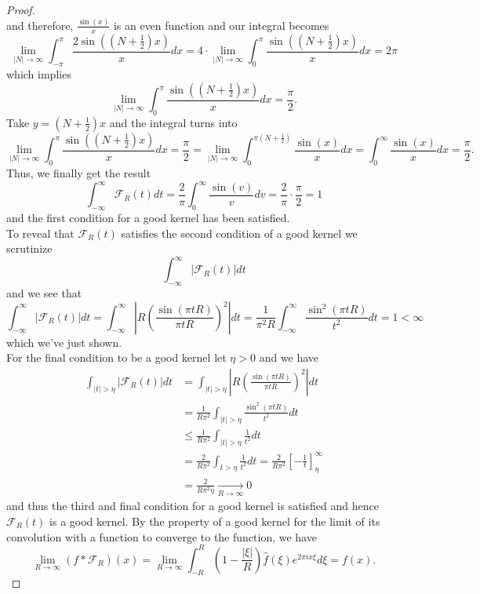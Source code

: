 \documentclass{article}
\begin{document}
\begin{proof}
\[  \]
  and therefore, $\frac{\sin(x)}{x}$ is an even function and our integral becomes
  \[
    \lim\limits_{|N| \to \infty} \int_{-\pi}^{\pi} \frac{2 \sin\left(\left(N + \frac{1}{2}\right)x\right)}{x}dx = 4 \cdot \lim\limits_{|N| \to \infty} \int_{0}^{\pi} \frac{ \sin\left(\left(N + \frac{1}{2}\right)x\right)}{x}dx = 2 \pi 
  \]
  which implies 
  \[
    \lim\limits_{|N| \to \infty}\int_{0}^{\pi} \frac{ \sin\left(\left(N + \frac{1}{2}\right)x\right)}{x}dx = \frac{\pi}{2}.
  \]
  Take $y = \left(N + \frac{1}{2}\right)x$ and the integral turns into 
  \[
    \lim\limits_{|N| \to \infty}\int_{0}^{\pi} \frac{ \sin\left(\left(N + \frac{1}{2}\right)x\right)}{x}dx = \frac{\pi}{2} = \lim\limits_{|N| \to \infty}\int_{0}^{\pi\left(N + \frac{1}{2}\right)} \frac{ \sin\left(x\right)}{x}dx = \int_{0}^{\infty} \frac{\sin(x)}{x}dx =  \frac{\pi}{2}.
  \]
  Thus, we finally get the result
  \[
  \int_{-\infty}^{\infty}  \mathcal{F}_R(t) dt = \frac{2}{\pi}\int_0^{\infty}\frac{\sin(v)}{v}dv = \frac{2}{\pi}\cdot \frac{\pi}{2} = 1
  \]
  and the first condition for a good kernel has been satisfied. \\ 

   To reveal that $\mathcal{F}_R(t)$ satisfies the second condition of a good kernel we scrutinize
   \[
   \int_{-\infty}^{\infty}|\mathcal{F}_R(t)|dt 
   \]
   and we see that 
   \[
    \int_{-\infty}^{\infty}|\mathcal{F}_R(t)|dt = \int_{-\infty}^{\infty} \left|R \left(\frac{\sin(\pi t R)}{\pi t R} \right)^2 \right| dt = \frac{1}{\pi^2 R} \int_{-\infty}^{\infty} \frac{\sin^2(\pi t R)}{t^2}dt = 1 < \infty
   \]
   which we've just shown.\\
   
   For the final condition to be a good kernel let $\eta > 0$ and we have 
   \begin{align*}
    \int_{|t| > \eta}|\mathcal{F}_R(t)|dt &= \int_{|t| > \eta} \left|R \left(\frac{\sin(\pi t R)}{\pi t R}\right)^2 \right| dt \\
    &= \frac{1}{R\pi^2} \int_{|t| > \eta} \frac{\sin^2(\pi t R)}{t^2}dt \\
    &\leq \frac{1}{R\pi^2} \int_{|t| > \eta} \frac{1}{t^2} dt \\
    &= \frac{2}{R \pi^2} \int_{t > \eta} \frac{1}{t^2} dt = \frac{2}{R\pi^2} \left[-\frac{1}{t}\right]_{\eta}^{\infty} \\
    &= \frac{2}{R \pi^2 \eta} \xrightarrow[R \to \infty]{} 0
   \end{align*}
   and thus the third and final condition for a good kernel is satisfied and hence $\mathcal{F}_R(t)$ is a good kernel. By the property of a good kernel for the limit of its convolution with a function to converge to the function, we have
   \[
    \lim\limits_{R \to \infty} (f * \mathcal{F}_R)(x) = \lim\limits_{R \to \infty} \int_{-R}^R \left(1 - \frac{|\xi|}{R}\right)\hat{f}(\xi)e^{2 \pi ix \xi}d \xi = f(x).
   \]
\end{proof}
\end{document}
